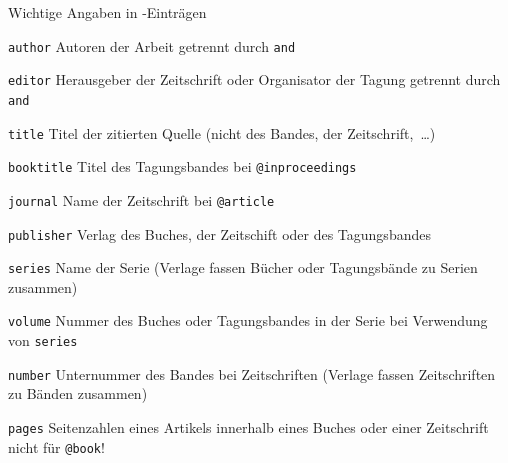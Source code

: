 \begin{Frame}{Wichtige Angaben in \BibTeX-Einträgen}
  \lstset{language=BibTeX}
  \begin{Block}{\lstinline-author-}
    Autoren der Arbeit getrennt durch \lstinline-and-
  \end{Block}

  \begin{Block}{\lstinline-editor-}
    Herausgeber der Zeitschrift oder Organisator der Tagung
    getrennt durch \lstinline-and-
  \end{Block}

  \begin{Block}{\lstinline-title-}
    Titel der zitierten Quelle
    (nicht des Bandes, der Zeitschrift,~\ldots)
  \end{Block}

  \framebreak

  \begin{Block}{\lstinline-booktitle-}
    Titel des Tagungsbandes
    bei \lstinline-@inproceedings-
  \end{Block}

  \begin{Block}{\lstinline-journal-}
    Name der Zeitschrift
    bei \lstinline-@article-
  \end{Block}

  \begin{Block}{\lstinline-publisher-}
    Verlag des Buches, der Zeitschift oder des Tagungsbandes
  \end{Block}

  \framebreak

  \begin{Block}{\lstinline-series-}
    Name der Serie (Verlage fassen Bücher
    oder Tagungsbände zu Serien zusammen)
  \end{Block}

  \begin{Block}{\lstinline-volume-}
    Nummer des Buches oder Tagungsbandes in der Serie
    bei Verwendung von \lstinline-series-
  \end{Block}

  \begin{Block}{\lstinline-number-}
    Unternummer des Bandes bei Zeitschriften
    (Verlage fassen Zeitschriften zu Bänden zusammen)
  \end{Block}

  \framebreak

  \begin{Block}{\lstinline-pages-}
    Seitenzahlen eines Artikels innerhalb
    eines Buches oder einer Zeitschrift
    \alert{nicht für \lstinline-@book-!}
  \end{Block}


\end{Frame}
